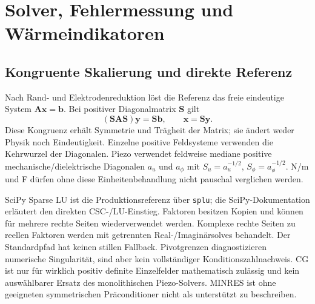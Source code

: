 \chapter{Solver, Fehlermessung und Wärmeindikatoren}\label{chap:solvers}
\section{Kongruente Skalierung und direkte Referenz}
Nach Rand- und Elektrodenreduktion löst die Referenz das freie eindeutige System
$\mathbf A\mathbf x=\mathbf b$. Bei positiver Diagonalmatrix $\mathbf S$ gilt
\begin{equation}\label{eq:scale}
(\mathbf S\mathbf A\mathbf S)\mathbf y=\mathbf S\mathbf b,
\qquad\mathbf x=\mathbf S\mathbf y.
\end{equation}
Diese Kongruenz erhält Symmetrie und Trägheit der Matrix; sie ändert weder
Physik noch Eindeutigkeit. Einzelne positive Feldsysteme verwenden die
Kehrwurzel der Diagonalen. Piezo verwendet feldweise mediane positive
mechanische/dielektrische Diagonalen $a_u$ und $a_\phi$ mit
$S_u=a_u^{-1/2}$, $S_\phi=a_\phi^{-1/2}$.
N/m und F dürfen ohne diese Einheitenbehandlung nicht pauschal verglichen werden.

SciPy Sparse LU ist die Produktionsreferenz über \texttt{splu}; die
SciPy-Dokumentation \cite{scipy-lu} erläutert den direkten CSC-/LU-Einstieg.
Faktoren besitzen Kopien und können für mehrere rechte Seiten wiederverwendet
werden. Komplexe rechte Seiten zu reellen Faktoren werden mit getrennten
Real-/Imaginärsolves behandelt. Der Standardpfad hat keinen stillen Fallback.
Pivotgrenzen diagnostizieren numerische Singularität, sind aber kein
vollständiger Konditionszahlnachweis. CG ist nur für wirklich positiv definite
Einzelfelder mathematisch zulässig und kein auswählbarer Ersatz des
monolithischen Piezo-Solvers. MINRES ist ohne geeigneten symmetrischen
Präconditioner nicht als unterstützt zu beschreiben.


